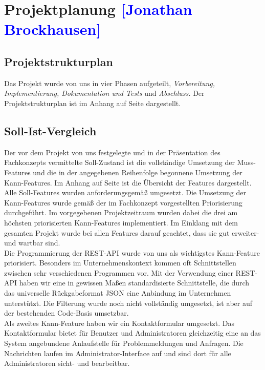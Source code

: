 

\section{Projektplanung \textcolor{blue}{[Jonathan Brockhausen]}}

\subsection{Projektstrukturplan}
Das Projekt wurde von uns in vier Phasen aufgeteilt, \textit{Vorbereitung, Implementierung, \glqq{}Dokumentation und Tests\grqq{}} und \textit{Abschluss.}
Der Projektstrukturplan ist im Anhang auf Seite \pageref{PSP} dargestellt.

\subsection{Soll-Ist-Vergleich}
Der vor dem Projekt von uns festgelegte und in der Präsentation des Fachkonzepts vermittelte Soll-Zustand ist die vollständige Umsetzung der Muss-Features und die in der angegebenen Reihenfolge begonnene Umsetzung der Kann-Features.
Im Anhang auf Seite \pageref{PM_SOLLIST} ist die Übersicht der Features dargestellt. Alle Soll-Features wurden anforderungsgemäß umgesetzt. Die Umsetzung der Kann-Features wurde gemäß der im Fachkonzept vorgestellten Priorisierung durchgeführt. Im vorgegebenen Projektzeitraum wurden dabei die drei am höchsten priorisierten Kann-Features implementiert. Im Einklang mit dem gesamten Projekt wurde bei allen Features darauf geachtet, dass sie gut erweiter- und wartbar sind.\\
Die Programmierung der REST-API wurde von uns als wichtigstes Kann-Feature priorisiert. Besonders im Unternehmenskontext kommen oft Schnittstellen zwischen sehr verschiedenen Programmen vor. Mit der Verwendung einer REST-API haben wir eine in gewissen Maßen standardisierte Schnittstelle, die durch das universelle Rückgabeformat JSON eine Anbindung im Unternehmen unterstützt. Die Filterung wurde noch nicht vollständig umgesetzt, ist aber auf der bestehenden Code-Basis umsetzbar.\\
Als zweites Kann-Feature haben wir ein Kontaktformular umgesetzt. Das Kontaktformular bietet für Benutzer und Administratoren gleichzeitig eine an das System angebundene Anlaufstelle für Problemmeldungen und Anfragen. Die Nachrichten laufen im Administrator-Interface auf und sind dort für alle Administratoren sicht- und bearbeitbar.\\
